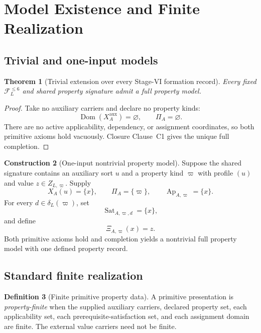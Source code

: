 \documentclass[11pt]{article}
\newcommand{\FVI}{\mathcal F_{L}^{\le 6}}
\newcommand{\Ap}{\operatorname{Ap}}
\newcommand{\Sat}{\operatorname{Sat}}
\newcommand{\Dom}{\operatorname{Dom}}
\newtheorem{theorem}{Theorem}[section]
\theoremstyle{definition}
\newtheorem{definition}[theorem]{Definition}
\newtheorem{construction}[theorem]{Construction}
\theoremstyle{remark}
\begin{document}
\section{Model Existence and Finite Realization}
\label{sec:finite}

\subsection{Trivial and one-input models}

\begin{theorem}[Trivial extension over every Stage-VI formation record]
\label{thm:trivial-extension}
Every fixed \(\FVI\) and shared property signature admit a full property model.
\end{theorem}

\begin{proof}
Take no auxiliary carriers and declare no property kinds:
\[
\Dom(X_A^{\mathrm{aux}})=\varnothing,
\qquad
\Pi_A=\varnothing.
\]
There are no active applicability, dependency, or assignment coordinates, so both primitive axioms hold vacuously.
Closure Clause~C1 gives the unique full completion.
\end{proof}

\begin{construction}[One-input nontrivial property model]
Suppose the shared signature contains an auxiliary sort \(u\) and a property kind \(\varpi\) with profile \((u)\) and value \(z\in Z_{L,\varpi}\).
Supply
\[
X_A(u)=\{x\},
\qquad
\Pi_A=\{\varpi\},
\qquad
\Ap_{A,\varpi}=\{x\}.
\]
For every \(d\in\delta_L(\varpi)\), set
\[
\Sat_{A,\varpi,d}=\{x\},
\]
and define
\[
\Xi_{A,\varpi}(x)=z.
\]
Both primitive axioms hold and completion yields a nontrivial full property model with one defined property record.
\end{construction}

\subsection{Standard finite realization}

\begin{definition}[Finite primitive property data]
A primitive presentation is \emph{property-finite} when the supplied auxiliary carriers, declared property set, each applicability set, each prerequisite-satisfaction set, and each assignment domain are finite.
The external value carriers need not be finite.
\end{definition}
\end{document}
